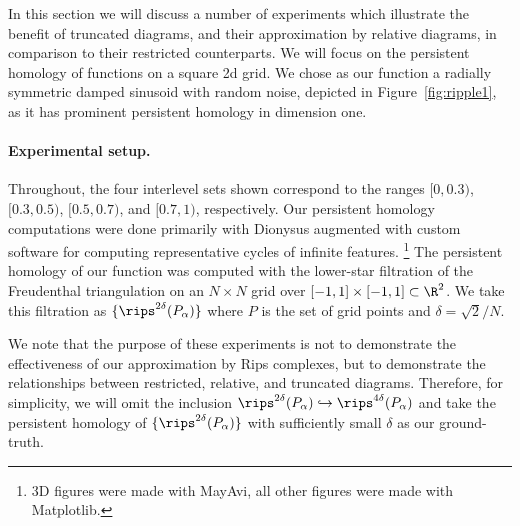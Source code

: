 
In this section we will discuss a number of experiments which illustrate the benefit of truncated diagrams, and their approximation by relative diagrams, in comparison to their restricted counterparts.
We will focus on the persistent homology of functions on a square 2d grid.%
We chose as our function a radially symmetric damped sinusoid with random noise, depicted in Figure~\ref{fig:ripple1}, as it has prominent persistent homology in dimension one.

\paragraph*{Experimental setup.}

Throughout, the four interlevel sets shown correspond to the ranges $[0, 0.3)$, $[0.3, 0.5)$, $[0.5, 0.7)$, and $[0.7, 1)$, respectively.
Our persistent homology computations were done primarily with Dionysus augmented with custom software for computing representative cycles of infinite features.
\footnote{3D figures were made with MayAvi, all other figures were made with Matplotlib.}
The persistent homology of our function was computed with the lower-star filtration of the Freudenthal triangulation on an $N\times N$ grid over $[-1,1]\times[-1,1]\subset\R^2$.
We take this filtration as $\{\rips^{2\delta}(P_\alpha)\}$ where $P$ is the set of grid points and $\delta = \sqrt{2} / N$.

We note that the purpose of these experiments is not to demonstrate the effectiveness of our approximation by Rips complexes, but to demonstrate the relationships between restricted, relative, and truncated diagrams.
Therefore, for simplicity, we will omit the inclusion $\rips^{2\delta}(P_\alpha)\hookrightarrow\rips^{4\delta}(P_\alpha)$ and take the persistent homology of $\{\rips^{2\delta}(P_\alpha)\}$ with sufficiently small $\delta$ as our ground-truth.

